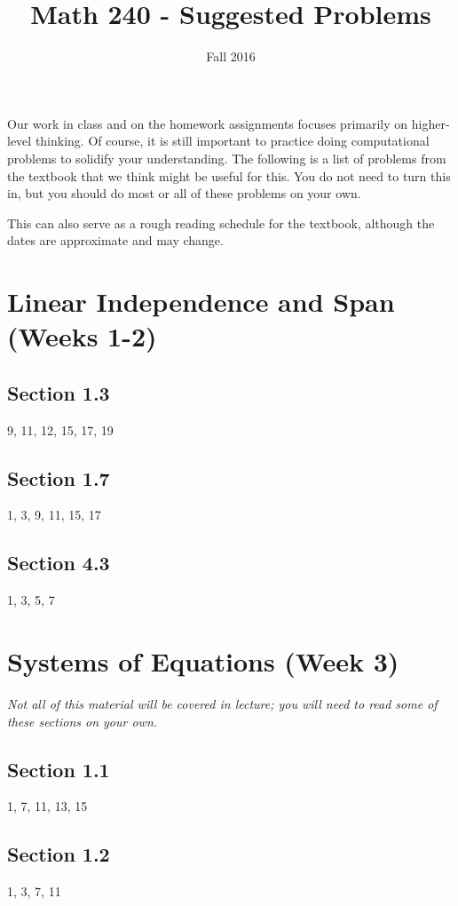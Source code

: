 \documentclass{amsart}
\begin{document}
	\title{Math 240 - Suggested Problems}
	\author{Fall 2016}
	\maketitle
	

Our work in class and on the homework assignments focuses primarily on higher-level thinking.  Of course, it is still important to practice doing computational problems to solidify your understanding.  The following is a list of problems from the textbook that we think might be useful for this.
You do not need to turn this in, but you should do most or all of these problems on your own.

\bigskip

This can also serve as a rough reading schedule for the textbook, although the dates are approximate and may change.


\section{Linear Independence and Span (Weeks 1-2)}

\subsection*{Section 1.3} 9, 11, 12, 15, 17, 19
\subsection*{Section 1.7} 1, 3, 9, 11, 15, 17
\subsection*{Section 4.3} 1, 3, 5, 7


\section{Systems of Equations (Week 3)}

\textit{Not all of this material will be covered in lecture; you will need to read some of these sections on your own.}

\subsection*{Section 1.1} 1, 7, 11, 13, 15
\subsection*{Section 1.2} 1, 3, 7, 11
\end{document}
